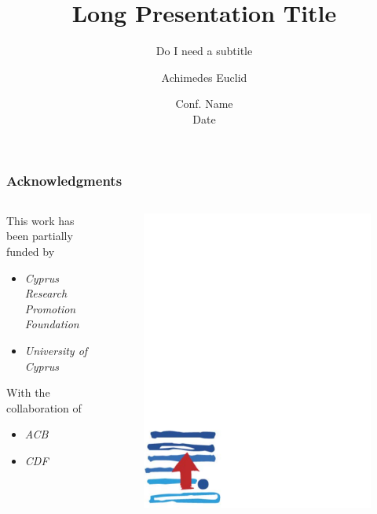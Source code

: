 \documentclass[hyperref={pdfpagelabels=false}]{beamer}
\title[Short title]{Long Presentation Title}
\subtitle{Do I need a subtitle}
\author{Achimedes Euclid}
\institute{
KIOS Research Center for Intelligent Systems and Networks\\
Dept. of Electrical and Computer Engineering\\
University of Cyprus
}
\date{Conf. Name\\Date}
\begin{document}


\begin{frame}
  \titlepage
\end{frame}


\begin{frame} 
\frametitle{Acknowledgments}
	\begin{columns}
		\begin{column}{7cm}
		This work has been partially funded by
			\begin{itemize}
			\item \textit{Cyprus Research Promotion Foundation}
			\item \textit{University of Cyprus}
			\end{itemize}
		With the collaboration of
			\begin{itemize}
			\item \textit{ACB}
			\item \textit{CDF}
			\end{itemize}		
		\end{column}	
		\begin{column}{3cm}
			\begin{figure}
			\includegraphics[totalheight=1.5cm]{./figures/ipe.pdf} 

\end{figure}
\end{column}
\end{columns}
\end{frame}
\end{document}
